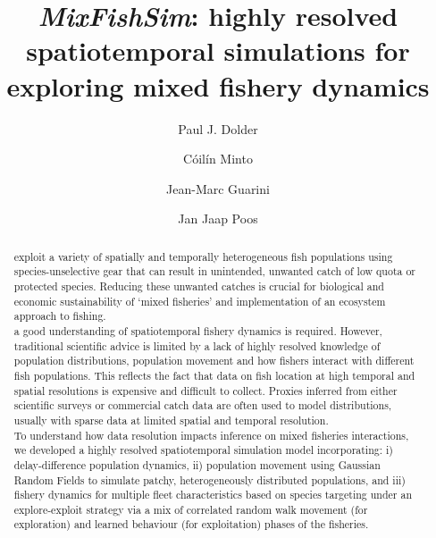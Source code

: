 \documentclass[review]{elsarticle}
\begin{document}
\begin{frontmatter}
\title{\emph{MixFishSim}: highly resolved spatiotemporal simulations for
	exploring mixed fishery dynamics}

\author[1,2]{Paul J. Dolder}

\author[1]{Cóilín Minto}
\author[3]{Jean-Marc Guarini}
\author[4]{Jan Jaap Poos}

\address[1]{Galway-Mayo Institute of Technology (GMIT), Dublin Road, Galway,
	Ireland} 
\address[2]{Centre for Environment, Fisheries and Aquaculture Science (Cefas),
	Pakefield Road, Lowestoft, UK}
\address[3]{, 4 Place Jussieu,
	75005 Paris, France}
\address[4]{Wageningen Marine Research, Haringkade 1 1976 CP IJmuiden,
	Netherlands}

\begin{abstract}

 exploit a variety 
of spatially and temporally heterogeneous fish populations using
species-unselective gear that can result in unintended, unwanted catch of low
quota or protected species. Reducing these unwanted catches is crucial for
biological and economic sustainability of `mixed fisheries' and implementation
of an ecosystem approach to fishing. \\

 a good understanding of
spatiotemporal fishery dynamics is required. However, traditional scientific
advice is limited by a lack of highly resolved knowledge of population
distributions, population movement and how fishers interact with different fish
populations. This reflects the fact that data on fish location at high temporal
and spatial resolutions is expensive and difficult to collect. Proxies inferred
from either scientific surveys or commercial catch data are often used to model
distributions, usually with sparse data at limited spatial and temporal
resolution. \\ 

To understand how data resolution impacts inference on mixed fisheries
interactions, we developed a highly resolved spatiotemporal simulation model
incorporating: i) delay-difference population dynamics, ii) population movement
using Gaussian Random Fields to simulate patchy, heterogeneously distributed
populations, and iii) fishery dynamics for multiple fleet characteristics based
on species targeting under an explore-exploit strategy via a mix of correlated
random walk movement (for exploration) and learned behaviour (for exploitation)
phases of the fisheries.  \\ 


\end{abstract}
\end{frontmatter}
\end{document}

